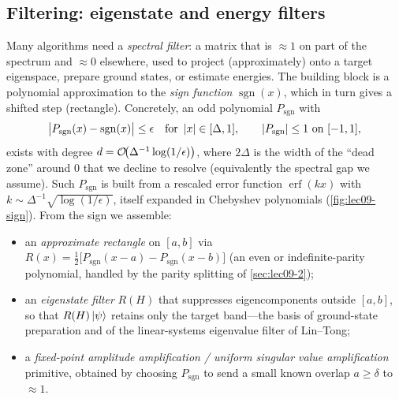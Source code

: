 \subsection*{Filtering: eigenstate and energy filters}

Many algorithms need a \emph{spectral filter}: a matrix that is $\approx1$ on part of
the spectrum and $\approx0$ elsewhere, used to project (approximately) onto a target
eigenspace, prepare ground states, or estimate energies. The building block is a
polynomial approximation to the \emph{sign function} $\operatorname{sgn}(x)$, which in
turn gives a shifted step (rectangle). Concretely, an odd polynomial $P_{\mathrm{sgn}}$
with
\begin{equation}
  \bigl|P_{\mathrm{sgn}}(x)-\operatorname{sgn}(x)\bigr|\le\epsilon
  \quad\text{for } \left\lvert x \right\rvert\in[\Delta,1],\qquad \left\lvert P_{\mathrm{sgn}} \right\rvert\le1 \text{ on }
  [-1,1],
  \label{eq:lec09-sign}
\end{equation}
exists with degree $d=\mathcal{O}\!\bigl(\Delta^{-1}\log(1/\epsilon)\bigr)$, where
$2\Delta$ is the width of the ``dead zone'' around $0$ that we decline to resolve
(equivalently the spectral gap we assume). Such $P_{\mathrm{sgn}}$ is built from a
rescaled error function $\operatorname{erf}(kx)$ with $k\sim\Delta^{-1}
\sqrt{\log(1/\epsilon)}$, itself expanded in Chebyshev polynomials
(\cref{fig:lec09-sign}). From the sign we
assemble:
\begin{itemize}[leftmargin=1.4em,nosep]
  \item an \emph{approximate rectangle} on $[a,b]$ via
    $R(x)=\tfrac12\bigl[P_{\mathrm{sgn}}(x-a)-P_{\mathrm{sgn}}(x-b)\bigr]$ (an even or
    indefinite-parity polynomial, handled by the parity splitting of
    \cref{sec:lec09-2});
  \item an \emph{eigenstate filter} $R(H)$ that suppresses eigencomponents outside
    $[a,b]$, so that $R(H)\ket\psi$ retains only the target band---the basis of
    ground-state preparation and of the linear-systems eigenvalue filter of Lin--Tong;
  \item a \emph{fixed-point amplitude amplification / uniform singular value
    amplification} primitive, obtained by choosing $P_{\mathrm{sgn}}$ to send a small
    known overlap $a\ge\delta$ to $\approx1$.
\end{itemize}

